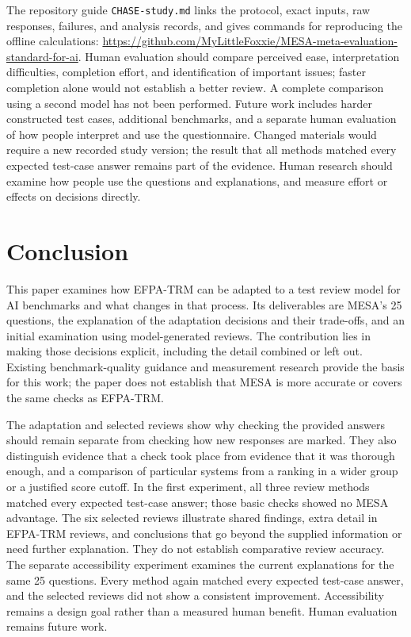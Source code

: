 \documentclass[10pt,conference]{IEEEtran}
\begin{document}
The repository guide \texttt{CHASE-study.md} links the protocol, exact inputs, raw responses, failures, and analysis records, and gives commands for reproducing the offline calculations: \url{https://github.com/MyLittleFoxxie/MESA-meta-evaluation-standard-for-ai}.
Human evaluation should compare perceived ease, interpretation difficulties, completion effort, and identification of important issues; faster completion alone would not establish a better review. A complete comparison using a second model has not been performed. Future work includes harder constructed test cases, additional benchmarks, and a separate human evaluation of how people interpret and use the questionnaire. Changed materials would require a new recorded study version; the result that all methods matched every expected test-case answer remains part of the evidence. Human research should examine how people use the questions and explanations, and measure effort or effects on decisions directly.

\section{Conclusion}
This paper examines how EFPA-TRM can be adapted to a test review model for AI benchmarks and what changes in that process. Its deliverables are MESA's 25 questions, the explanation of the adaptation decisions and their trade-offs, and an initial examination using model-generated reviews. The contribution lies in making those decisions explicit, including the detail combined or left out. Existing benchmark-quality guidance and measurement research provide the basis for this work; the paper does not establish that MESA is more accurate or covers the same checks as EFPA-TRM.

The adaptation and selected reviews show why checking the provided answers should remain separate from checking how new responses are marked. They also distinguish evidence that a check took place from evidence that it was thorough enough, and a comparison of particular systems from a ranking in a wider group or a justified score cutoff. In the first experiment, all three review methods matched every expected test-case answer; those basic checks showed no MESA advantage. The six selected reviews illustrate shared findings, extra detail in EFPA-TRM reviews, and conclusions that go beyond the supplied information or need further explanation. They do not establish comparative review accuracy. The separate accessibility experiment examines the current explanations for the same 25 questions. Every method again matched every expected test-case answer, and the selected reviews did not show a consistent improvement. Accessibility remains a design goal rather than a measured human benefit. Human evaluation remains future work.
\end{document}
